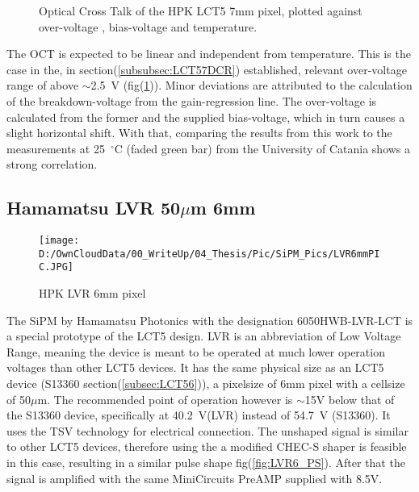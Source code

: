 \documentclass[12pt,article,type=msc,colorback,accentcolor=tud9c]{tudthesis}
\begin{document}
\begin{figure}[h!]
\begin{centering}
\caption[LCT5 7mm OCT]{Optical Cross Talk of the HPK LCT5 7mm pixel, plotted against over-voltage , bias-voltage and temperature.}
\label{fig:LCT57_OCT}
\end{centering}
\end{figure}
The OCT is expected to be linear and independent from temperature. This is the case in the, in section(\ref{subsubsec:LCT57DCR}) established, relevant over-voltage range of above $\sim$2.5~V (fig(\ref{fig:LCT57_OCT})). Minor deviations are attributed to the calculation of the breakdown-voltage from the gain-regression line. The over-voltage is calculated from the former and the supplied bias-voltage, which in turn causes a slight horizontal shift. With that, comparing the results from this work to the measurements at 25~$^\circ$C (faded green bar) from the University of Catania shows a strong correlation.



\clearpage

\subsection{Hamamatsu LVR 50$\mu$m 6mm}
\begin{wrapfigure}{R}{0.4\textwidth}
\centering
\texttt{[image: D:/OwnCloudData/00\_WriteUp/04\_Thesis/Pic/SiPM\_Pics/LVR6mmPIC.JPG]}
\caption[LCT5 LVR 6mm SiPM]{\label{fig:LVR6_pixel}HPK LVR 6mm pixel}
\end{wrapfigure}

The SiPM by Hamamatsu Photonics with the designation 6050HWB-LVR-LCT is a special prototype of the LCT5 design. LVR is an abbreviation of Low Voltage Range, meaning the device is meant to be operated at much lower operation voltages than other LCT5 devices. It has the same physical size as an LCT5 device (S13360 section(\ref{subsec:LCT56})), a pixelsize of 6mm pixel with a cellsize of 50$\mu$m. The recommended point of operation however is $\sim$15V below that of the S13360 device, specifically at 40.2~V(LVR) instead of 54.7~V (S13360). It uses the TSV technology for electrical connection. The unshaped signal is similar to other LCT5 devices, therefore using the a modified CHEC-S shaper is feasible in this case, resulting in a similar pulse shape fig(\ref{fig:LVR6_PS}). After that the signal is amplified with the same MiniCircuits PreAMP supplied with 8.5V.
\\
\end{document}

